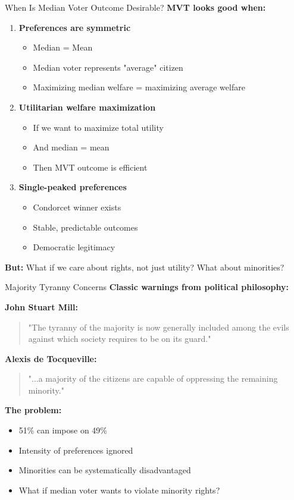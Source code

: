 \documentclass[10pt]{beamer}
\begin{document}
\begin{frame}{When Is Median Voter Outcome Desirable?}
\textbf{MVT looks good when:}


\begin{enumerate}
\item \textbf{Preferences are symmetric}
\begin{itemize}
\item Median = Mean
\item Median voter represents "average" citizen
\item Maximizing median welfare = maximizing average welfare
\end{itemize}


\item \textbf{Utilitarian welfare maximization}
\begin{itemize}
\item If we want to maximize total utility
\item And median = mean
\item Then MVT outcome is efficient
\end{itemize}


\item \textbf{Single-peaked preferences}
\begin{itemize}
\item Condorcet winner exists
\item Stable, predictable outcomes
\item Democratic legitimacy
\end{itemize}
\end{enumerate}



\textbf{But:} What if we care about rights, not just utility? What about minorities?
\end{frame}

\begin{frame}{Majority Tyranny Concerns}
\textbf{Classic warnings from political philosophy:}



\textbf{John Stuart Mill:}
\begin{quote}
"The tyranny of the majority is now generally included among the evils against which society requires to be on its guard."
\end{quote}



\textbf{Alexis de Tocqueville:}
\begin{quote}
"...a majority of the citizens are capable of oppressing the remaining minority."
\end{quote}



\textbf{The problem:}
\begin{itemize}
\item 51\% can impose on 49\%
\item Intensity of preferences ignored
\item Minorities can be systematically disadvantaged
\item What if median voter wants to violate minority rights?
\end{itemize}
\end{frame}
\end{document}
